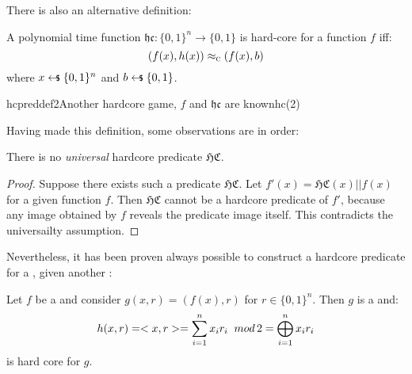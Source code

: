 There is also an alternative definition:
\begin{defn}
    A polynomial time function $\mathfrak{hc} : \{0,1\}^n \to \{0,1\}$ is hard-core for  a function $f$ iff:
    \begin{equation*}
        (f(x), h(x)) \approx_\textsc{c} (f(x), b)
    \end{equation*}
    where $x \pickUAR \{0, 1\}^n$ and $b \pickUAR \{0, 1\}$.
\end{defn}


\begin{cryptogame}{hcpreddef2}{Another hardcore game, $f$ and $\mathfrak{hc}$ are known}{hc(2)}
    \seqdelay

    \seqdelay
    \seqdelay

\end{cryptogame}


Having made this definition, some observations are in order:

\begin{clm}
    There is no \textit{universal} hardcore predicate $\mathfrak{HC}$.
\end{clm}

\begin{proof}
    Suppose there exists such a predicate $\mathfrak{HC}$. Let $f'(x) = \mathfrak{HC}(x) || f(x)$ for a given function $f$. Then $\mathfrak{HC}$ cannot be a hardcore predicate of $f'$, because any image obtained by $f$ reveals the predicate image itself. This contradicts the universailty assumption.
\end{proof}

Nevertheless, it has been proven always possible to construct a hardcore predicate for a \owf{}, given another \owf:

\begin{theorem}
    Let $f$ be a \owf{} and consider $g(x,r)=(f(x), r)$ for $r \in \{0,1\}^{n}$.
    Then $g$ is a \owf{} and:
    \begin{equation*}
        h(x,r) = <x, r> = \sum_{i=1}^{n}x_ir_i\;\; mod\, 2 = \bigoplus_{i=1}^{n}x_ir_i
    \end{equation*}
    is hard core for $g$.
\end{theorem}

